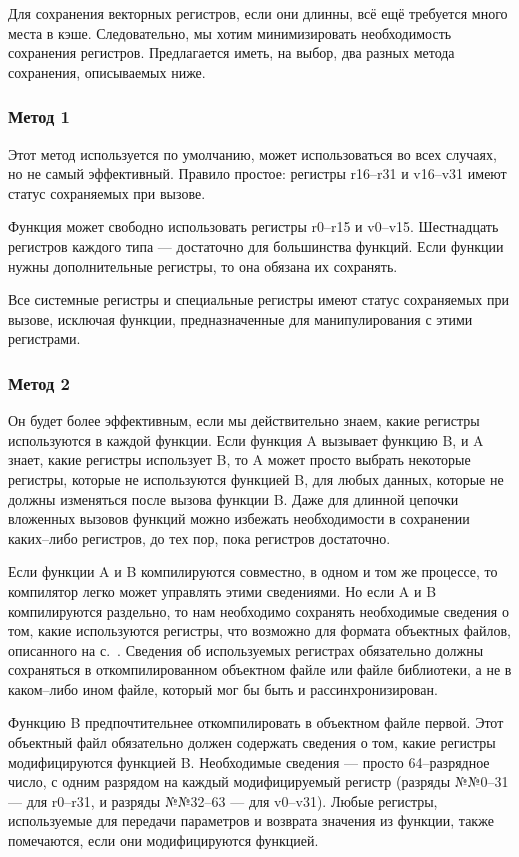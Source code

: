 \documentclass[forwardcom.tex]{subfiles}
\begin{document}
Для сохранения векторных регистров, если они длинны, всё ещё требуется много места в кэше. Следовательно, мы хотим минимизировать необходимость сохранения регистров. Предлагается иметь, на выбор, два разных метода сохранения, описываемых ниже.

\subsubsection{Метод 1}
Этот метод используется по умолчанию, может использоваться во всех случаях, но не самый эффективный. Правило простое: регистры r16--r31 и v16--v31 имеют статус сохраняемых при вызове.

Функция может свободно использовать регистры r0--r15 и v0--v15. Шестнадцать регистров каждого типа --- достаточно для большинства функций. Если функции нужны дополнительные регистры, то она обязана их сохранять.

Все системные регистры и специальные регистры имеют статус сохраняемых при вызове, исключая функции, предназначенные для манипулирования с этими регистрами.

\subsubsection{Метод 2}
Он будет более эффективным, если мы действительно знаем, какие регистры используются в каждой функции. Если функция A вызывает функцию B, и A знает, какие регистры использует B, то A может просто выбрать некоторые регистры, которые не используются функцией B, для любых данных, которые не должны изменяться после вызова функции B. Даже для длинной цепочки вложенных вызовов функций можно избежать необходимости в сохранении каких--либо регистров, до тех пор, пока регистров достаточно.

Если функции A и B компилируются совместно, в одном и том же процессе, то компилятор легко может управлять этими сведениями. Но если A и B компилируются раздельно, то нам необходимо сохранять необходимые сведения о том, какие используются регистры, что возможно для формата объектных файлов, описанного на с.~\pageref{objectFileFormat}. Сведения об используемых регистрах обязательно должны сохраняться в откомпилированном объектном файле или файле библиотеки, а не в каком--либо ином файле, который мог бы быть и рассинхронизирован.

Функцию B предпочтительнее откомпилировать в объектном файле первой. Этот объектный файл обязательно должен содержать сведения о том, какие регистры модифицируются функцией B. Необходимые сведения --- просто 64--разрядное число, с одним разрядом на каждый модифицируемый регистр (разряды №№0--31 --- для r0--r31, и разряды №№32--63 --- для v0--v31). Любые регистры, используемые для передачи параметров и возврата значения из функции, также помечаются, если они модифицируются функцией.
\end{document}
